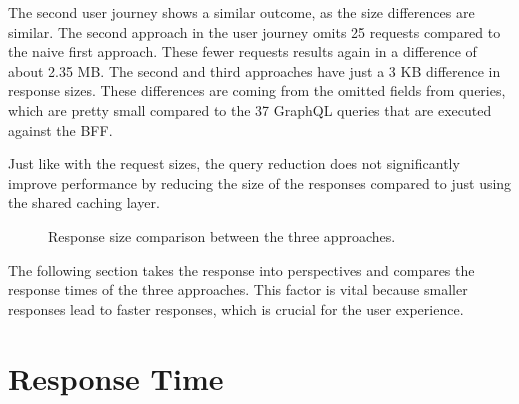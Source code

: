\bigskip

\noindent The second user journey shows a similar outcome, as the size differences are similar. The second approach in the user journey omits 25 requests compared to the naive first approach. These fewer requests results again in a difference of about 2.35 MB. The second and third approaches have just a 3 KB difference in response sizes. These differences are coming from the omitted fields from queries, which are pretty small compared to the 37 GraphQL queries that are executed against the \ac{BFF}.

\bigskip

\noindent Just like with the request sizes, the query reduction does not significantly improve performance by reducing the size of the responses compared to just using the shared caching layer.

\begin{figure}[H]
  \centering
  \caption{Response size comparison between the three approaches.}\label{fig:discussion:response-size}
\end{figure}

\noindent The following section takes the response into perspectives and compares the response times of the three approaches. This factor is vital because smaller responses lead to faster responses, which is crucial for the user experience.

\section{Response Time}\label{section:discussion:response-times}

